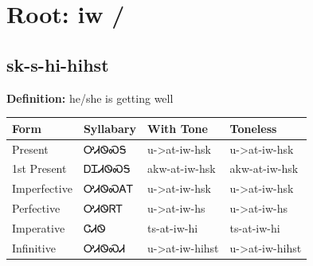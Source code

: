 \documentclass{article}%
\begin{document}
%
\normalsize%
\section*{Root: iw / }%
\subsection*{sk-s-hi-hihst}%
\textbf{Definition: }%
he/she is getting well%
\\[0.5em]%
\begin{tabular}{|l|l|l|l|}%
\hline%
\textbf{Form}&\textbf{Syllabary}&\textbf{With Tone}&\textbf{Toneless}\\%
\hline%
Present&ᎤᏗᏫᏍᎦ&u{-}>at{-}iw{-}hsk&u{-}>at{-}iw{-}hsk\\%
1st Present&ᎠᏆᏗᏫᏍᎦ&akw{-}at{-}iw{-}hsk&akw{-}at{-}iw{-}hsk\\%
Imperfective&ᎤᏗᏫᏍᎪᎢ&u{-}>at{-}iw{-}hsk&u{-}>at{-}iw{-}hsk\\%
Perfective&ᎤᏗᏫᏒᎢ&u{-}>at{-}iw{-}hs&u{-}>at{-}iw{-}hs\\%
Imperative&ᏣᏗᏫ&ts{-}at{-}iw{-}hi&ts{-}at{-}iw{-}hi\\%
Infinitive&ᎤᏗᏫᏍᏗ&u{-}>at{-}iw{-}hihst&u{-}>at{-}iw{-}hihst\\%
\hline%
\end{tabular}%
\\[1em]%
\end{document}
